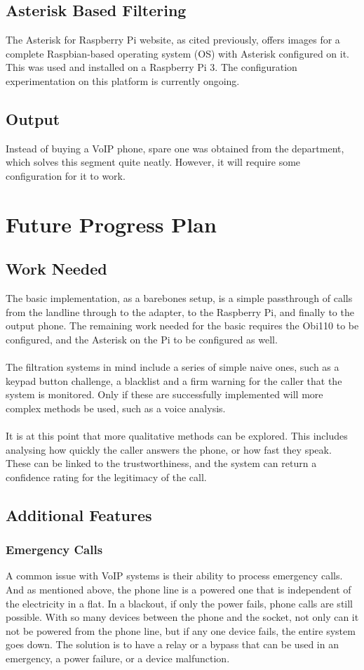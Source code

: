 \documentclass[12pt,a4paper]{report}
\begin{document}
\subsection{Asterisk Based Filtering}
The Asterisk for Raspberry Pi website, as cited previously, offers images for a complete Raspbian-based operating system (OS) with Asterisk configured on it. This was used and installed on a Raspberry Pi 3. The configuration experimentation on this platform is currently ongoing.

\subsection{Output}
Instead of buying a VoIP phone, spare one was obtained from the department, which solves this segment quite neatly. However, it will require some configuration for it to work.

\section{Future Progress Plan}
\subsection{Work Needed}
The basic implementation, as a barebones setup, is a simple passthrough of calls from the landline through to the adapter, to the Raspberry Pi, and finally to the output phone. The remaining work needed for the basic requires the Obi110 to be configured, and the Asterisk on the Pi to be configured as well.
\\\\
The filtration systems in mind include a series of simple naive ones, such as a keypad button challenge, a blacklist and a firm warning for the caller that the system is monitored. Only if these are successfully implemented will more complex methods be used, such as a voice analysis.
\\\\
It is at this point that more qualitative methods can be explored. This includes analysing how quickly the caller answers the phone, or how fast they speak. These can be linked to the trustworthiness, and the system can return a confidence rating for the legitimacy of the call.

\subsection{Additional Features}
\subsubsection{Emergency Calls}
A common issue with VoIP systems is their ability to process emergency calls. And as mentioned above, the phone line is a powered one that is independent of the electricity in a flat. In a blackout, if only the power fails, phone calls are still possible. With so many devices between the phone and the socket, not only can it not be powered from the phone line, but if any one device fails, the entire system goes down. The solution is to have a relay or a bypass that can be used in an emergency, a power failure, or a device malfunction.
\end{document}
